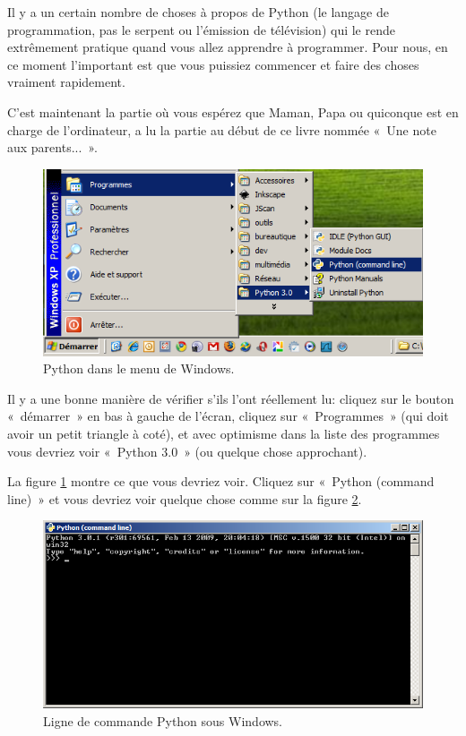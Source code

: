 Il y a un certain nombre de choses à propos de Python (le langage de programmation, pas le serpent ou l'émission de télévision) qui le rende extrêmement pratique quand vous allez apprendre à programmer. Pour nous, en ce moment l'important est que vous puissiez commencer et faire des choses vraiment rapidement.

C'est maintenant la partie où vous espérez que Maman, Papa ou quiconque est en charge de l'ordinateur, a lu la partie au début de ce livre nommée «~Une note aux parents...~».

\begin{figure}[h!]
\capstart
\centering
\includegraphics[scale=0.6]{images/startmenu}
\caption{Python dans le menu de Windows.}\label{fig:startmenu}
\end{figure}

Il y a une bonne manière de vérifier s'ils l'ont réellement lu: cliquez sur le bouton «~démarrer~» en bas à gauche de l'écran, cliquez sur «~Programmes~» (qui doit avoir un petit triangle à coté), et avec optimisme dans la liste des programmes vous devriez voir «~Python 3.0~» (ou quelque chose approchant).
 
La figure \ref{fig:startmenu} montre ce que vous devriez voir. Cliquez sur «~Python (command line)~» et vous devriez voir quelque chose comme sur la figure \ref{fig:pycl}.

\begin{figure}[h!]
\centering
\includegraphics[scale=0.6]{images/pycl}
\caption{Ligne de commande Python sous Windows.}\label{fig:pycl}
\end{figure}

